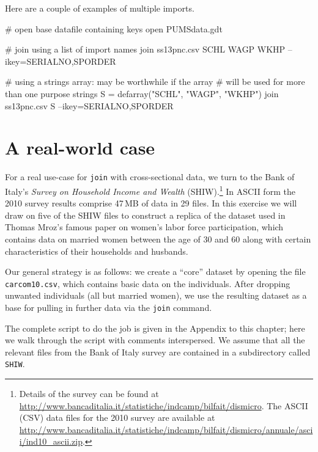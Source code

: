 Here are a couple of examples of multiple imports.
\begin{code}
# open base datafile containing keys
open PUMSdata.gdt

# join using a list of import names
join ss13pnc.csv SCHL WAGP WKHP --ikey=SERIALNO,SPORDER

# using a strings array: may be worthwhile if the array
# will be used for more than one purpose
strings S = defarray("SCHL", "WAGP", "WKHP")
join ss13pnc.csv S --ikey=SERIALNO,SPORDER
\end{code}

\section{A real-world case}
\label{sec:join-SHIW}

For a real use-case for \texttt{join} with cross-sectional data, we
turn to the Bank of Italy's \textit{Survey on Household Income and
  Wealth} (SHIW).\footnote{Details of the survey can be found at
  \url{http://www.bancaditalia.it/statistiche/indcamp/bilfait/dismicro}.
  The ASCII (CSV) data files for the 2010 survey are available at
  \url{http://www.bancaditalia.it/statistiche/indcamp/bilfait/dismicro/annuale/ascii/ind10_ascii.zip}.}
In ASCII form the 2010 survey results comprise 47\,MB of data in 29
files. In this exercise we will draw on five of the SHIW files to
construct a replica of the dataset used in Thomas Mroz's famous paper
\citep{mroz87} on women's labor force participation, which contains
data on married women between the age of 30 and 60 along with certain
characteristics of their households and husbands.

Our general strategy is as follows: we create a ``core'' dataset by
opening the file \texttt{carcom10.csv}, which contains basic data on
the individuals. After dropping unwanted individuals (all but married
women), we use the resulting dataset as a base for pulling in further
data via the \texttt{join} command.

The complete script to do the job is given in the Appendix to this
chapter; here we walk through the script with comments interspersed.
We assume that all the relevant files from the Bank of Italy survey
are contained in a subdirectory called \texttt{SHIW}.

